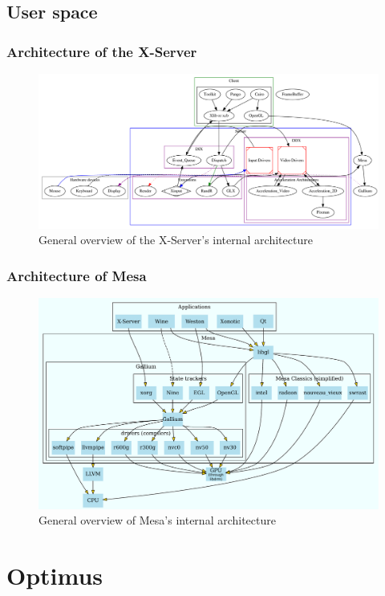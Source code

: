 \documentclass[11pt,english,compress]{beamer}
\begin{document}
\subsection{User space}

\begin{frame}
	\frametitle{Architecture of the X-Server}

	\begin{figure}[h]
		\centering
		\includegraphics[width=1\linewidth]{imgs/xorg.pdf}
		\caption{General overview of the X-Server's internal architecture}
	\end{figure}
\end{frame}

\begin{frame}
	\frametitle{Architecture of Mesa}

	\begin{figure}[h]
		\centering
		\includegraphics[width=1\linewidth]{imgs/mesa.pdf}
		\caption{General overview of Mesa's internal architecture}
	\end{figure}
\end{frame}

\section{Optimus}
\end{document}
